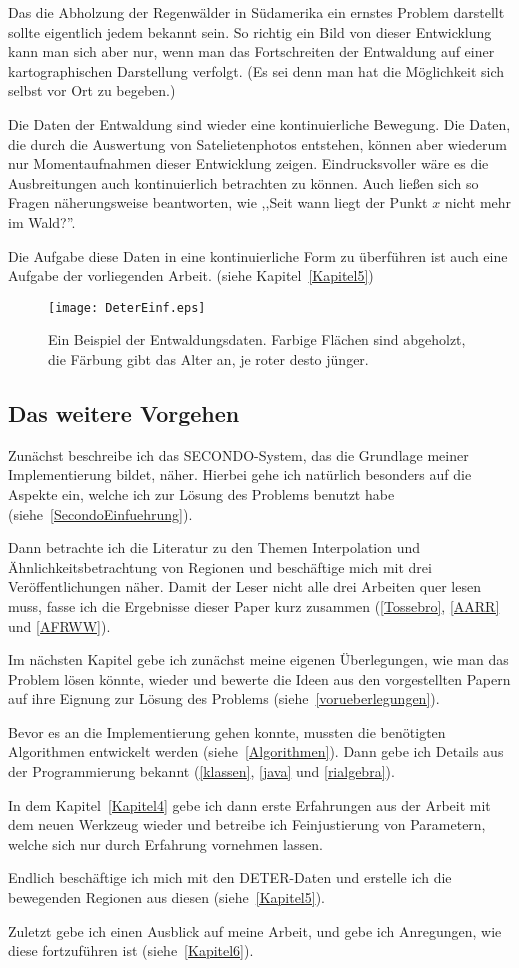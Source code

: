 Das die Abholzung der Regenwälder in Südamerika ein ernstes Problem darstellt sollte eigentlich jedem bekannt sein. So richtig ein Bild von dieser Entwicklung kann man sich aber nur, wenn man das Fortschreiten der Entwaldung auf einer kartographischen Darstellung verfolgt. (Es sei denn man hat die Möglichkeit sich selbst vor Ort zu begeben.) 

Die Daten der Entwaldung sind wieder eine kontinuierliche Bewegung. Die Daten, die durch die Auswertung von Satelietenphotos entstehen, können aber wiederum nur Momentaufnahmen dieser Entwicklung zeigen. Eindrucksvoller wäre es die Ausbreitungen auch kontinuierlich betrachten zu können. Auch ließen sich so Fragen näherungsweise beantworten, wie ,,Seit wann liegt der Punkt $x$ nicht mehr im Wald?''.

Die Aufgabe diese Daten in eine kontinuierliche Form zu überführen ist auch eine Aufgabe der vorliegenden Arbeit. (siehe Kapitel~\ref{Kapitel5})

\begin{figure}
	\centering
	\texttt{[image: DeterEinf.eps]}
	\caption[Ein Beispiel für Entwaldungsdaten]{Ein Beispiel der Entwaldungsdaten. Farbige Flächen sind abgeholzt, die Färbung gibt das Alter an, je roter desto jünger.}
	\label{fig:DeterEinfuehrung}
\end{figure}


\subsection*{Das weitere Vorgehen}

Zunächst beschreibe ich das SECONDO-System, das die Grundlage meiner Implementierung bildet, näher. Hierbei gehe ich natürlich besonders auf die Aspekte ein, welche ich zur Lösung des Problems benutzt habe (siehe~\ref{SecondoEinfuehrung}).

Dann betrachte ich die Literatur zu den Themen Interpolation und Ähnlichkeitsbetrachtung von Regionen und beschäftige mich mit drei Veröffentlichungen näher. Damit der Leser nicht alle drei Arbeiten quer lesen muss, fasse ich die Ergebnisse dieser Paper kurz zusammen (\ref{Tossebro}, \ref{AARR} und \ref{AFRWW}).

Im nächsten Kapitel gebe ich zunächst meine eigenen Überlegungen, wie man das Problem lösen könnte, wieder und bewerte die Ideen aus den vorgestellten Papern auf ihre Eignung zur Lösung des Problems (siehe~\ref{vorueberlegungen}).
 
Bevor es an die Implementierung gehen konnte, mussten die benötigten Algorithmen entwickelt werden (siehe~\ref{Algorithmen}). Dann gebe ich Details aus der Programmierung bekannt (\ref{klassen}, \ref{java} und \ref{rialgebra}).

In dem Kapitel~\ref{Kapitel4} gebe ich dann erste Erfahrungen aus der Arbeit mit dem neuen Werkzeug wieder und betreibe ich Feinjustierung von Parametern, welche sich nur durch Erfahrung vornehmen lassen.

Endlich beschäftige ich mich mit den DETER-Daten und erstelle ich die bewegenden Regionen aus diesen (siehe~\ref{Kapitel5}).

Zuletzt gebe ich einen Ausblick auf meine Arbeit, und gebe ich Anregungen, wie diese fortzuführen ist (siehe~\ref{Kapitel6}).
